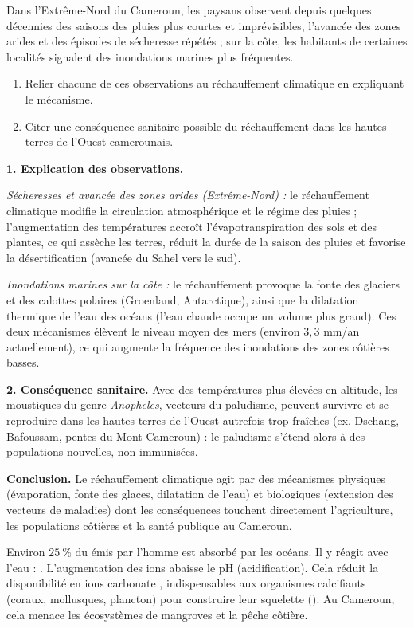 \documentclass[11pt]{article}
\newcommand{\cle}[1]{{\popxbold\color{popdark}#1}}
\begin{document}
\begin{exoresolu}
Dans l'Extrême-Nord du Cameroun, les paysans observent depuis quelques décennies des saisons des pluies plus courtes et imprévisibles, l'avancée des zones arides et des épisodes de sécheresse répétés ; sur la côte, les habitants de certaines localités signalent des inondations marines plus fréquentes.
\begin{enumerate}
\item Relier chacune de ces observations au réchauffement climatique en expliquant le mécanisme.
\item Citer une conséquence sanitaire possible du réchauffement dans les hautes terres de l'Ouest camerounais.
\end{enumerate}
\tcblower
\textbf{1. Explication des observations.}

\emph{Sécheresses et avancée des zones arides (Extrême-Nord) :} le réchauffement climatique modifie la circulation atmosphérique et le régime des pluies ; l'augmentation des températures accroît l'\cle{évapotranspiration} des sols et des plantes, ce qui assèche les terres, réduit la durée de la saison des pluies et favorise la \cle{désertification} (avancée du Sahel vers le sud).

\emph{Inondations marines sur la côte :} le réchauffement provoque la \cle{fonte des glaciers} et des calottes polaires (Groenland, Antarctique), ainsi que la \cle{dilatation thermique} de l'eau des océans (l'eau chaude occupe un volume plus grand). Ces deux mécanismes élèvent le niveau moyen des mers (environ $3,3$ mm/an actuellement), ce qui augmente la fréquence des inondations des zones côtières basses.

\textbf{2. Conséquence sanitaire.} Avec des températures plus élevées en altitude, les moustiques du genre \emph{Anopheles}, vecteurs du \cle{paludisme}, peuvent survivre et se reproduire dans les hautes terres de l'Ouest autrefois trop fraîches (ex. Dschang, Bafoussam, pentes du Mont Cameroun) : le paludisme s'étend alors à des populations nouvelles, non immunisées.

\textbf{Conclusion.} Le réchauffement climatique agit par des mécanismes physiques (évaporation, fonte des glaces, dilatation de l'eau) et biologiques (extension des vecteurs de maladies) dont les conséquences touchent directement l'agriculture, les populations côtières et la santé publique au Cameroun.
\end{exoresolu}

\begin{savaistu}
Environ $25\ \%$ du  émis par l'homme est absorbé par les océans. Il y réagit avec l'eau : . L'augmentation des ions  abaisse le pH (acidification). Cela réduit la disponibilité en ions carbonate , indispensables aux organismes calcifiants (coraux, mollusques, plancton) pour construire leur squelette (). Au Cameroun, cela menace les écosystèmes de mangroves et la pêche côtière.
\end{savaistu}
\end{document}
